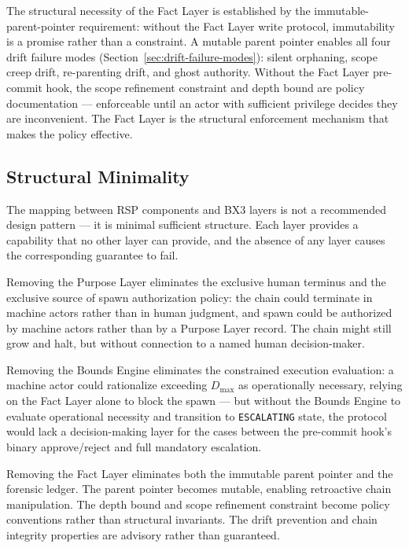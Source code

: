 \medskip
The structural necessity of the Fact Layer is established by the immutable-parent-pointer requirement: without the Fact Layer write protocol, immutability is a promise rather than a constraint. A mutable parent pointer enables all four drift failure modes (Section~\ref{sec:drift-failure-modes}): silent orphaning, scope creep drift, re-parenting drift, and ghost authority. Without the Fact Layer pre-commit hook, the scope refinement constraint and depth bound are policy documentation — enforceable until an actor with sufficient privilege decides they are inconvenient. The Fact Layer is the structural enforcement mechanism that makes the policy effective.

\subsection{Structural Minimality}
\label{sec:rs-minimality}

The mapping between RSP components and BX3 layers is not a recommended design pattern — it is minimal sufficient structure. Each layer provides a capability that no other layer can provide, and the absence of any layer causes the corresponding guarantee to fail.

Removing the Purpose Layer eliminates the exclusive human terminus and the exclusive source of spawn authorization policy: the chain could terminate in machine actors rather than in human judgment, and spawn could be authorized by machine actors rather than by a Purpose Layer record. The chain might still grow and halt, but without connection to a named human decision-maker.

Removing the Bounds Engine eliminates the constrained execution evaluation: a machine actor could rationalize exceeding $D_{\text{max}}$ as operationally necessary, relying on the Fact Layer alone to block the spawn — but without the Bounds Engine to evaluate operational necessity and transition to \texttt{ESCALATING} state, the protocol would lack a decision-making layer for the cases between the pre-commit hook's binary approve/reject and full mandatory escalation.

Removing the Fact Layer eliminates both the immutable parent pointer and the forensic ledger. The parent pointer becomes mutable, enabling retroactive chain manipulation. The depth bound and scope refinement constraint become policy conventions rather than structural invariants. The drift prevention and chain integrity properties are advisory rather than guaranteed.

